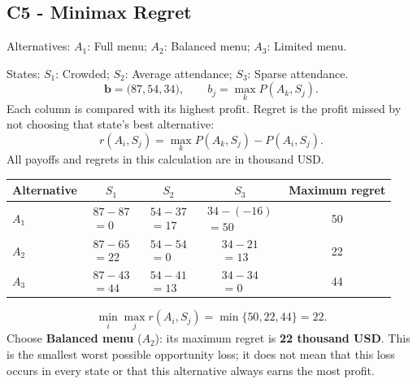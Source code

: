 \subsection*{C5 - Minimax Regret }
\label{sol:festival-meals-c5}
Alternatives: $A_1$: Full menu; $A_2$: Balanced menu; $A_3$: Limited menu.\par
States: $S_1$: Crowded; $S_2$: Average attendance; $S_3$: Sparse attendance.
\[\boldsymbol{b}=\bigl(87,54,34\bigr),\qquad b_j=\max_k P(A_k,S_j).\]
Each column is compared with its highest profit. Regret is the profit missed by not choosing that state's best alternative:
\[r(A_i,S_j)=\max_k P(A_k,S_j)-P(A_i,S_j).\]
All payoffs and regrets in this calculation are in thousand USD.
\begin{center}
\begin{tabular}{@{}lcccc@{}}\toprule
Alternative & $S_1$ & $S_2$ & $S_3$ & Maximum regret\\\midrule
$A_1$ & $\begin{gathered}87-87\\=0\end{gathered}$ & $\begin{gathered}54-37\\=17\end{gathered}$ & $\begin{gathered}34-(-16)\\=50\end{gathered}$ & 50\\
$A_2$ & $\begin{gathered}87-65\\=22\end{gathered}$ & $\begin{gathered}54-54\\=0\end{gathered}$ & $\begin{gathered}34-21\\=13\end{gathered}$ & 22\\
$A_3$ & $\begin{gathered}87-43\\=44\end{gathered}$ & $\begin{gathered}54-41\\=13\end{gathered}$ & $\begin{gathered}34-34\\=0\end{gathered}$ & 44\\
\bottomrule\end{tabular}
\end{center}
\[\min_i\max_j r(A_i,S_j)=\min\{50,22,44\}=22.\]
Choose \textbf{Balanced menu} ($A_2$): its maximum regret is \textbf{22 thousand USD}. This is the smallest worst possible opportunity loss; it does not mean that this loss occurs in every state or that this alternative always earns the most profit.
\par\vspace{4mm}

